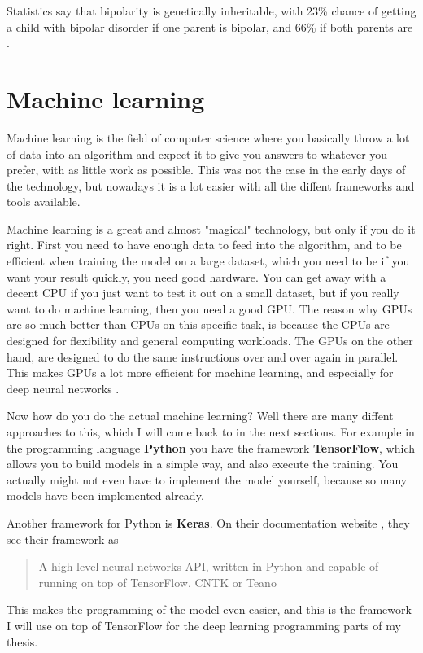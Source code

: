 Statistics say that bipolarity is genetically inheritable, with 23\% chance of getting a child with bipolar disorder 
if one parent is bipolar, and 66\% if both parents are \cite{bipolar_statistics}. 


\newpage
\section{Machine learning}
Machine learning is the field of computer science where you basically throw a lot of data into an algorithm
and expect it to give you answers to whatever you prefer, with as little work as possible. 
This was not the case in the early days of the technology, but nowadays it is a lot easier with all the diffent 
frameworks and tools available.

Machine learning is a great and almost "magical" technology, but only if you do it right.
First you need to have enough data to feed into the algorithm, and to be efficient when training the model on a 
large dataset, which you need to be if you want your result quickly, you need good hardware. You can get away with a 
decent CPU if you just want to test it out on a small dataset, but if you really want to do machine learning,
then you need a good GPU. The reason why GPUs are so much better than CPUs on this specific task, 
is because the CPUs are designed for flexibility and general computing workloads. The GPUs on the other hand, 
are designed to do the same instructions over and over again in parallel. This makes GPUs a lot more efficient for 
machine learning, and especially for deep neural networks \cite{cpu_vs_gpu_ml}. 

Now how do you do the actual machine learning? Well there are many diffent approaches to this, which I will come back to 
in the next sections. 
For example in the programming language \textbf{Python} you have the 
framework \textbf{TensorFlow}, which allows you to build models in a simple way, and also execute the training. 
You actually might not even have to implement the model yourself, because so many models have been implemented already. 

Another framework for Python is \textbf{Keras}. On their documentation website \cite{keras_docs}, they see their 
framework as \blockquote{A high-level neural networks API, written in Python and capable of running on top of TensorFlow, 
CNTK or Teano}. This makes the programming of the model even easier, and this is the framework I will use 
on top of TensorFlow for the deep learning programming parts of my thesis. 

